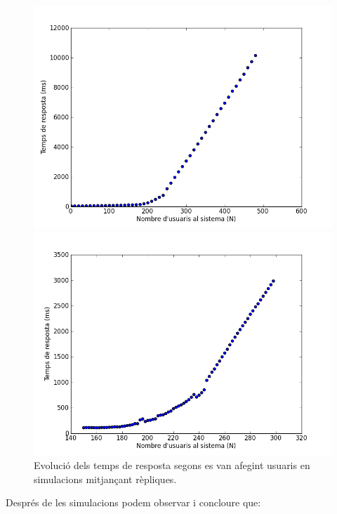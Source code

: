\begin{figure}
  \centering
  \includegraphics[width=\textwidth]{img/sim.png}

  \includegraphics[width=\textwidth]{img/sim-retall-150-300.png}

  \caption{Evolució dels temps de resposta segons es van afegint usuaris en
    simulacions mitjançant rèpliques.}
  \label{resultats:temps:grafica}

\end{figure}

Després de les simulacions podem observar i concloure que:


